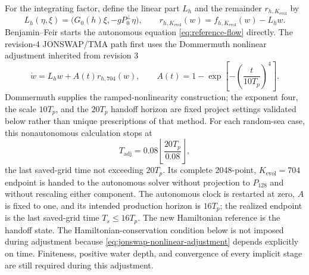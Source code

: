\documentclass[11pt]{article}
\begin{document}
For the integrating factor, define the linear part $L_h$ and the remainder
$r_{h,K_{\mathrm{evol}}}$ by
\begin{equation}
  L_h(\eta,\xi)
  =\bigl(G_0(h)\xi,-gP_0^\perp\eta\bigr),
  \qquad
  r_{h,K_{\mathrm{evol}}}(w)
  =f_{h,K_{\mathrm{evol}}}(w)-L_hw.
  \label{eq:reference-linear-split}
\end{equation}
Benjamin--Feir starts the autonomous equation
\eqref{eq:reference-flow} directly.  The revision-4 JONSWAP/TMA path first
uses the Dommermuth nonlinear adjustment inherited from revision
3~\cite{dommermuth2000}
\begin{equation}
  \dot w
  =L_hw+A(t)r_{h,704}(w),
  \qquad
  A(t)
  =1-\exp\!\left[-\left(\frac{t}{10T_p}\right)^4\right].
  \label{eq:jonswap-nonlinear-adjustment}
\end{equation}
Dommermuth supplies the ramped-nonlinearity construction; the exponent four,
the scale $10T_p$, and the $20T_p$ handoff horizon are fixed project
settings validated below rather than unique prescriptions of that method.
For each random-sea case, this nonautonomous calculation stops at
\begin{equation}
  T_{\mathrm{adj}}
  =0.08\left\lfloor\frac{20T_p}{0.08}\right\rfloor,
  \label{eq:jonswap-adjustment-endpoint}
\end{equation}
the last saved-grid time not exceeding \(20T_p\).  Its complete
2048-point, \(K_{\mathrm{evol}}=704\) endpoint is handed to the autonomous solver without
projection to \(P_{128}\) and without rescaling either component.  The
autonomous clock is restarted at zero, \(A\) is fixed to one, and its intended
production horizon is \(16T_p\); the realized endpoint is the last saved-grid
time \(T_s\leq16T_p\).  The new Hamiltonian reference is the handoff state.
The Hamiltonian-conservation
condition below is not imposed during adjustment because
\eqref{eq:jonswap-nonlinear-adjustment} depends explicitly on time.
Finiteness, positive water depth, and convergence of every implicit stage are
still required during this adjustment.
\end{document}
